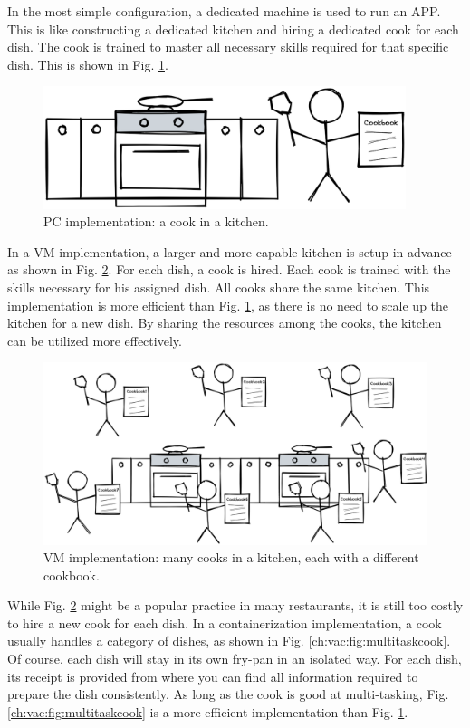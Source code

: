 In the most simple configuration, a dedicated machine is used to run an APP. This is like constructing a dedicated kitchen and hiring a dedicated cook for each dish. The cook is trained to master all necessary skills required for that specific dish. This is shown in Fig. \ref{ch:vac:fig:acookinakitchen}.
\begin{figure}[htbp]
	\centering
	\includegraphics[width=300pt]{chapters/ch-virtualization-and-containerization/figures/acookinakitchen.png}
	\caption{PC implementation: a cook in a kitchen.} \label{ch:vac:fig:acookinakitchen}
\end{figure}

In a VM implementation, a larger and more capable kitchen is setup in advance as shown in Fig. \ref{ch:vac:fig:manycooksinakitchen}. For each dish, a cook is hired. Each cook is trained with the skills necessary for his assigned dish. All cooks share the same kitchen. This implementation is more efficient than Fig. \ref{ch:vac:fig:acookinakitchen}, as there is no need to scale up the kitchen for a new dish. By sharing the resources among the cooks, the kitchen can be utilized more effectively.
\begin{figure}[htbp]
	\centering \includegraphics[width=350pt]{chapters/ch-virtualization-and-containerization/figures/manycooksinakitchen.png}
	\caption{VM implementation: many cooks in a kitchen, each with a different cookbook.} \label{ch:vac:fig:manycooksinakitchen}
\end{figure}

While Fig. \ref{ch:vac:fig:manycooksinakitchen} might be a popular practice in many restaurants, it is still too costly to hire a new cook for each dish. In a containerization implementation, a cook usually handles a category of dishes, as shown in Fig. \ref{ch:vac:fig:multitaskcook}. Of course, each dish will stay in its own fry-pan in an isolated way. For each dish, its receipt is provided from where you can find all information required to prepare the dish consistently. As long as the cook is good at multi-tasking, Fig. \ref{ch:vac:fig:multitaskcook} is a more efficient implementation than Fig. \ref{ch:vac:fig:acookinakitchen}.

